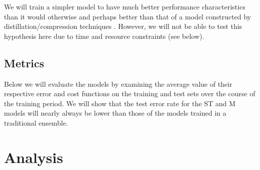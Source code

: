 \documentclass[english,a4paper,oneside]{amsart}
\theoremstyle{definition}
\begin{document}
We will train a simpler model to have much better performance characteristics than it would otherwise and perhaps better than that of a model constructed by distillation/compression techniques \cite{Distillation,Compression}. However, we will not be able to test this hypothesis here due to time and resource constraints (see  below). 

\subsection{Metrics}
Below we will evaluate the models by examining the average value of their respective error and cost functions on the training and test sets over the course of the training period.  We will show that the test error rate for the ST and M models will nearly always be lower than those of the models trained in a traditional ensemble. %

\section{Analysis}
\end{document}
